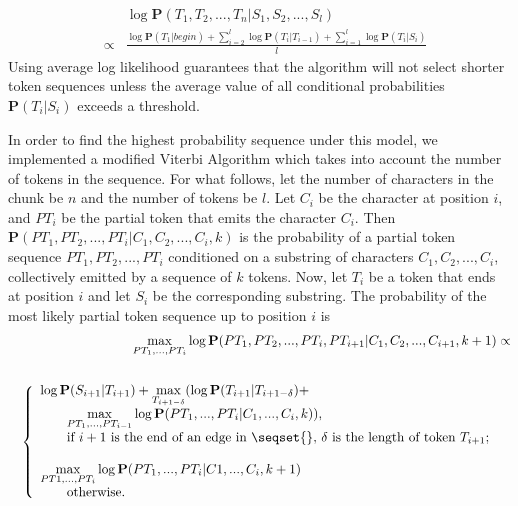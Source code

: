 \begin{eqnarray}
&& \log \mathbf{P}(T_1, T_2, ..., T_n|S_1, S_2, ..., S_l) \nonumber \\ 
& \propto & \frac{\log \mathbf{P}(T_1|begin) +
\sum_{i=2}^{l}\log \mathbf{P}(T_i|T_{i-1}) + 
\sum_{i=1}^{l}\log \mathbf{P}(T_i|S_i)}{l}\label{eqn:mod-viterbi}
\end{eqnarray}
\noindent
Using average log likelihood 
guarantees that the algorithm will not select shorter token sequences
unless the average value of all conditional
probabilities $\mathbf{P}(T_i|S_i)$ exceeds a threshold.

In order to find the highest probability sequence under this model,
we implemented a modified Viterbi Algorithm
which takes into account the number of tokens in the sequence.
For what follows,
let the number of characters in the chunk be $n$ and the number 
of tokens be $l$.  Let $C_i$ be the character at position $i$, and 
$PT_i$ be the partial token that emits the character $C_i$. 
Then
$\mathbf{P}(PT_1, PT_2, ..., PT_i|C_1, C_2, ..., C_i, k)$ is the
probability of a partial token sequence $PT_1, PT_2, ..., PT_i$
conditioned on a substring of characters $C_1, C_2, ..., C_i$,
collectively emitted by a sequence of $k$ tokens.
Now, let $T_i$ be a token
that ends at position $i$ and let $S_i$ be the corresponding substring. 
The probability of the most likely partial token sequence up to position 
$i$ is
\begin{eqnarray} 
&&\displaystyle{\max_{PT_1, ..., PT_i}}\log\mathbf{P}(PT_1, PT_2, ..., PT_i,
PT_{i+1}|C_1, C_2, ..., C_{i+1}, k+1) \propto \nonumber \\
&& \nonumber \\
&&\left\{
  \begin{array}{ll}
    \log \mathbf{P}(S_{i+1}|T_{i+1}) + 
    \displaystyle{\max_{T_{i+1-\delta}}}(\log\mathbf{P}(T_{i+1}|T_{i+1-\delta}) + \\
    \qquad \displaystyle{\max_{PT_1, ..., PT_{i-1}}}\log\mathbf{P}(PT_1, ..., PT_i|C_1, ..., C_i, k)), 
& \\ 
  \qquad \hbox{if $i+1$ is the end of an edge in \seqset{},
  $\delta$ is the length of token $T_{i+1}$;} \\\\
    \displaystyle{\max_{PT1, ..., PT_i}}\log\mathbf{P}(PT_1, ..., PT_i|C1, ...,
  C_i, k+1) \\
\qquad \hbox{otherwise.}
  \end{array}
\right. \label{eqn-forward}
\end{eqnarray}

